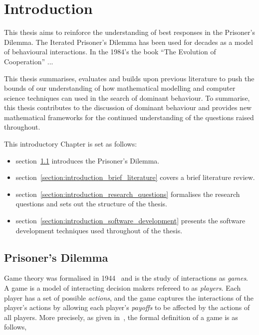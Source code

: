 \chapter{Introduction}\label{chapter:introduction}

This thesis aims to reinforce the understanding of best responses in the
Prisoner's Dilemma. The Iterated Prisoner’s Dilemma has been used for decades as
a model of behavioural interactions. In the 1984's the book ``The Evolution of
Cooperation'' ...

This thesis summarises, evaluates and builds upon previous literature to push
the bounds of our understanding of how mathematical modelling and computer
science techniques can used in the search of dominant behaviour. To summarise,
this thesis contributes to the discussion of dominant behaviour and provides new
mathematical frameworks for the continued understanding of the questions raised
throughout.

This introductory Chapter is set as follows:

\begin{itemize}
    \item section~\ref{section:introduction_prisoners_dilemma} introduces
    the Prisoner's Dilemma.
    \item section~\ref{section:introduction_brief_literature} covers a brief
    literature review.
    \item section~\ref{section:introduction_research_questions} formalises the research
    questions and sets out the structure of the thesis.
    \item section~\ref{section:introduction_software_development} presents the
    software development techniques used throughout of the thesis.
\end{itemize}

\section{Prisoner's Dilemma}\label{section:introduction_prisoners_dilemma}

Game theory was formalised in 1944~\cite{VonNeumann1944} and is the study of
interactions as \textit{games}. A game is a model of interacting
decision makers refereed to as \textit{players}. Each player has a set of
possible \textit{actions}, and the game captures the interactions of the player's
actions by allowing each player's \textit{payoffs} to be affected by the actions
of all players. More precisely, as given in~\cite{Osborne2004}, the formal
definition of a game is as follows,

